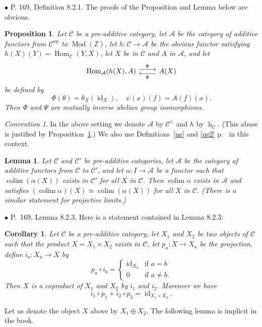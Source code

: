 \documentclass[12pt]{article}
\newtheorem{lem}[thm]{Lemma}
\newtheorem{prop}[thm]{Proposition}
\newtheorem{cor}[thm]{Corollary}
\theoremstyle{remark}%
\newtheorem{conv}[thm]{Convention}%
\newcommand{\bu}{\bullet}
\newcommand{\n}{\noindent}
\newcommand{\bb}{\mathbb}
\newcommand{\A}{\mathcal A}
\newcommand{\C}{\mathcal C}
\DeclareMathOperator*{\co}{colim}
\DeclareMathOperator{\hy}{h}
\DeclareMathOperator{\id}{id}
\DeclareMathOperator{\h}{Hom}
\DeclareMathOperator{\Mod}{Mod}
\DeclareMathOperator{\op}{op}
\begin{document}

\n$\bu$ P. 169, Definition 8.2.1. The proofs of the Proposition and Lemma below are obvious. 
\begin{prop}\label{payp}
Let $\C$ be a pre-additive category, let $\A$ be the category of additive functors from $\C^{\op}$ to $\Mod(\bb Z)$, let $h:\C\to\A$ be the obvious functor satisfying $h(X)(Y)=\h_\C(Y,X)$, let $X$ be in $\C$ and $A$ in $\A$, and let 
$$
\begin{tikzcd}
\h_\A(h(X),A)\ar[yshift=.7ex]{r}{\Phi}&A(X)\ar[yshift=-.7ex]{l}{\Psi}
\end{tikzcd}
$$
be defined by 
$$
\Phi(\theta)=\theta_X(\id_X),\quad\psi(x)(f)=A(f)(x).
$$
Then $\Phi$ and $\Psi$ are mutually inverse abelian group isomorphisms.
\end{prop}
\begin{conv}\label{payc}
In the above setting we denote $\A$ by $\C^\wedge$ and $h$ by $\hy_\C$. (This abuse is justified by Proposition~\ref{payp}.) We also use Definitions~\ref{ue} and \ref{ue2} p.~\pageref{ue} in this context. 
\end{conv} 
\begin{lem}\label{payl}
Let $\C$ and $\C'$ be pre-additive categories, let $\A$ be the category af additive functors from $\C$ to $\C'$, and let $\alpha:I\to\A$ be a functor such that $\co(\alpha(X))$ exists in $\C'$ for all $X$ in $\C$. Then $\co\alpha$ exists in $\A$ and satisfies $(\co\alpha)(X)\simeq\co(\alpha(X))$ for all $X$ in $\C$. (There is a similar statement for projective limits.)
\end{lem}


\n$\bu$ P.~169, Lemma 8.2.3. Here is a statement contained in Lemma 8.2.3:
%
\begin{cor}\label{823}
Let $\C$ be a pre-additive category, let $X_1$ and $X_2$ be two objects of $\C$ such that the product $X=X_1\times X_2$ exists in $\C$, let $p_a:X\to X_a$ be the projection, define $i_a:X_a\to X$ by 
$$
p_a\circ i_b=\begin{cases}\id_{X_a}&\text{if }a=b\\0&\text{if }a\not=b.\end{cases}
$$ 
Then $X$ is a coproduct of $X_1$ and $X_2$ by $i_1$ and $i_2$. Moreover we have 
$$
i_1\circ p_1+i_2\circ p_2=\id_{X_1\times X_2}.
$$
\end{cor}

Let us denote the object $X$ above by $X_1\oplus X_2$. The following lemma is implicit in the book. 
\end{document}
